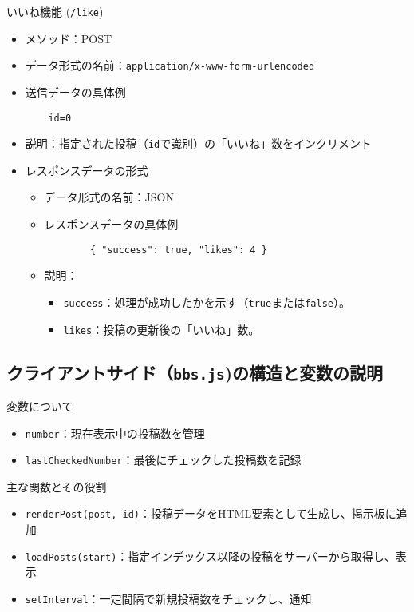 \documentclass[uplatex,dvipdfmx]{jsarticle}
\begin{document}
いいね機能 (\texttt{/like})
\begin{itemize}
    \item メソッド：POST
    \item データ形式の名前：\texttt{application/x-www-form-urlencoded}
    \item 送信データの具体例
    \begin{verbatim}
    id=0
    \end{verbatim}
    \item 説明：指定された投稿（\texttt{id}で識別）の「いいね」数をインクリメント
    \item レスポンスデータの形式
    \begin{itemize}
        \item データ形式の名前：JSON
        \item レスポンスデータの具体例
        \begin{verbatim}
        { "success": true, "likes": 4 }
        \end{verbatim}
        \item 説明：
        \begin{itemize}
            \item \texttt{success}：処理が成功したかを示す（\texttt{true}または\texttt{false}）。
            \item \texttt{likes}：投稿の更新後の「いいね」数。
        \end{itemize}
    \end{itemize}
\end{itemize}

\subsection{クライアントサイド（\texttt{bbs.js})の構造と変数の説明}
変数について
\begin{itemize}
    \item \texttt{number}：現在表示中の投稿数を管理
    \item \texttt{lastCheckedNumber}：最後にチェックした投稿数を記録
\end{itemize}

主な関数とその役割
\begin{itemize}
    \item \texttt{renderPost(post, id)}：投稿データをHTML要素として生成し、掲示板に追加
    \item \texttt{loadPosts(start)}：指定インデックス以降の投稿をサーバーから取得し、表示
    \item \texttt{setInterval}：一定間隔で新規投稿数をチェックし、通知
\end{itemize}
\end{document}
